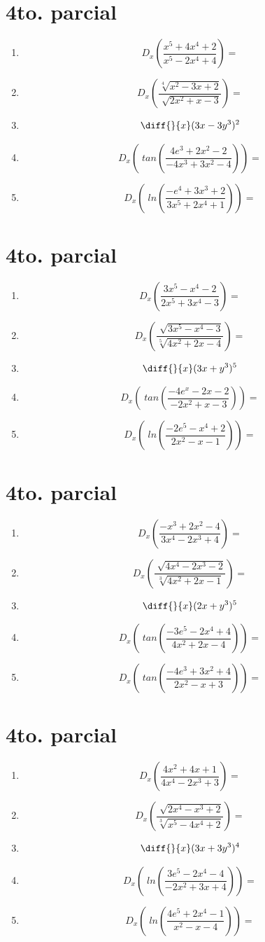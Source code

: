 \documentclass[oneside,spanish,letter]{article}
\begin{document}
\section{4to. parcial}
\begin{enumerate}
 \item $$ D_x \left( \frac{x^5+4x^4+2}{x^5-2x^4+4}\right)=$$
 \item $$ D_x \left( \frac{\sqrt[4]{x^2-3x+2}}{\sqrt[]{2x^2+x-3}}\right)=$$
\item $$\diff{}{x}(3x-3y^3)^2$$
 \item $$ D_x \left(\;tan\left( \frac{4e^3+2x^2-2}{-4x^3+3x^2-4}\right)\right)=$$
 \item $$ D_x \left(\;ln\left( \frac{-e^4+3x^3+2}{3x^5+2x^4+1}\right)\right)=$$
 \end{enumerate}
  \newpage
\section{4to. parcial}
\begin{enumerate}
 \item $$ D_x \left( \frac{3x^5-x^4-2}{2x^5+3x^4-3}\right)=$$
 \item $$ D_x \left( \frac{\sqrt[]{3x^5-x^4-3}}{\sqrt[5]{4x^2+2x-4}}\right)=$$
\item $$\diff{}{x}(3x+y^3)^5$$
 \item $$ D_x \left(\;tan\left( \frac{-4e^x-2x-2}{-2x^2+x-3}\right)\right)=$$
 \item $$ D_x \left(\;ln\left( \frac{-2e^5-x^4+2}{2x^2-x-1}\right)\right)=$$
 \end{enumerate}
  \newpage
\section{4to. parcial}
\begin{enumerate}
 \item $$ D_x \left( \frac{-x^3+2x^2-4}{3x^4-2x^3+4}\right)=$$
 \item $$ D_x \left( \frac{\sqrt[]{4x^4-2x^3-2}}{\sqrt[3]{4x^2+2x-1}}\right)=$$
\item $$\diff{}{x}(2x+y^3)^5$$
 \item $$ D_x \left(\;tan\left( \frac{-3e^5-2x^4+4}{4x^2+2x-4}\right)\right)=$$
 \item $$ D_x \left(\;tan\left( \frac{-4e^3+3x^2+4}{2x^2-x+3}\right)\right)=$$
 \end{enumerate}
  \newpage
\section{4to. parcial}
\begin{enumerate}
 \item $$ D_x \left( \frac{4x^2+4x+1}{4x^4-2x^3+3}\right)=$$
 \item $$ D_x \left( \frac{\sqrt[]{2x^4-x^3+2}}{\sqrt[3]{x^5-4x^4+2}}\right)=$$
\item $$\diff{}{x}(3x+3y^3)^4$$
 \item $$ D_x \left(\;ln\left( \frac{3e^5-2x^4-4}{-2x^2+3x+4}\right)\right)=$$
 \item $$ D_x \left(\;ln\left( \frac{4e^5+2x^4-1}{x^2-x-4}\right)\right)=$$
 \end{enumerate}
  \newpage
\end{document}
